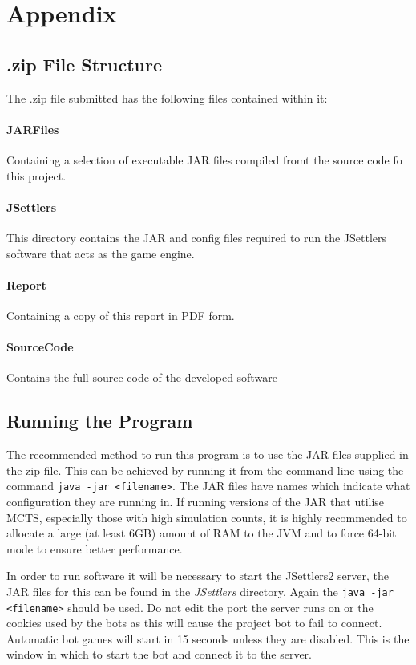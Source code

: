 \documentclass[]{article}
\let\oldsection\section
\renewcommand\section{\clearpage\oldsection}
\def\code#1{\texttt{#1}}
\begin{document}
\appendix
\section*{Appendix}
\subsection*{.zip File Structure}
The .zip file submitted has the following files contained within it:
\paragraph{JARFiles}Containing a selection of executable JAR files compiled fromt the source code fo this project. 
\paragraph{JSettlers}This directory contains the JAR and config files required to run the JSettlers software that acts as the game engine.
\paragraph{Report}Containing a copy of this report in PDF form.
\paragraph{SourceCode}Contains the full source code of the developed software

\vspace{2cm}

\subsection*{Running the Program}
The recommended method to run this program is to use the JAR files supplied in the zip file. This can be achieved by running it from the command line using the command \code{java -jar <filename>}. The JAR files have names which indicate what configuration they are running in. If running versions of the JAR that utilise MCTS, especially those with high simulation counts, it is highly recommended to allocate a large (at least 6GB) amount of RAM to the JVM and to force 64-bit mode to ensure better performance.  

\par In order to run software it will be necessary to start the JSettlers2 server, the JAR files for this can be found in the \textit{JSettlers} directory. Again the \code{java -jar <filename>} should be used. Do not edit the port the server runs on or the cookies used by the bots as this 
will cause the project bot to fail to connect. Automatic bot games will start in 15 seconds unless they are disabled. This is the window in which to start the bot and connect it to the server.
\end{document}
